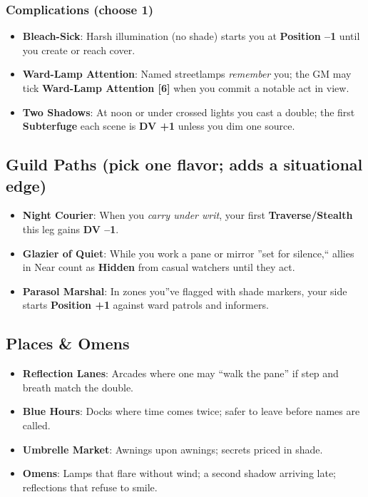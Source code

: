\documentclass[11pt,letterpaper]{article}
\begin{document}
\subsubsection*{Complications (choose 1)}
\begin{itemize}
\item \textbf{Bleach-Sick}: Harsh illumination (no shade) starts you at \textbf{Position --1} until you create or reach cover.
\item \textbf{Ward-Lamp Attention}: Named streetlamps \emph{remember} you; the GM may tick \textbf{Ward-Lamp Attention [6]} when you commit a notable act in view.
\item \textbf{Two Shadows}: At noon or under crossed lights you cast a double; the first \textbf{Subterfuge} each scene is \textbf{DV +1} unless you dim one source.
\end{itemize}

\subsection*{Guild Paths (pick one flavor; adds a situational edge)}
\begin{itemize}
\item \textbf{Night Courier}: When you \emph{carry under writ}, your first \textbf{Traverse/Stealth} this leg gains \textbf{DV --1}.
\item \textbf{Glazier of Quiet}: While you work a pane or mirror ''set for silence,`` allies in Near count as \textbf{Hidden} from casual watchers until they act.
\item \textbf{Parasol Marshal}: In zones you''ve flagged with shade markers, your side starts \textbf{Position +1} against ward patrols and informers.
\end{itemize}

\subsection*{Places \& Omens}
\begin{itemize}
\item \textbf{Reflection Lanes}: Arcades where one may ``walk the pane'' if step and breath match the double.
\item \textbf{Blue Hours}: Docks where time comes twice; safer to leave before names are called.
\item \textbf{Umbrelle Market}: Awnings upon awnings; secrets priced in shade.
\item \textbf{Omens}: Lamps that flare without wind; a second shadow arriving late; reflections that refuse to smile.
\end{itemize}
\end{document}

